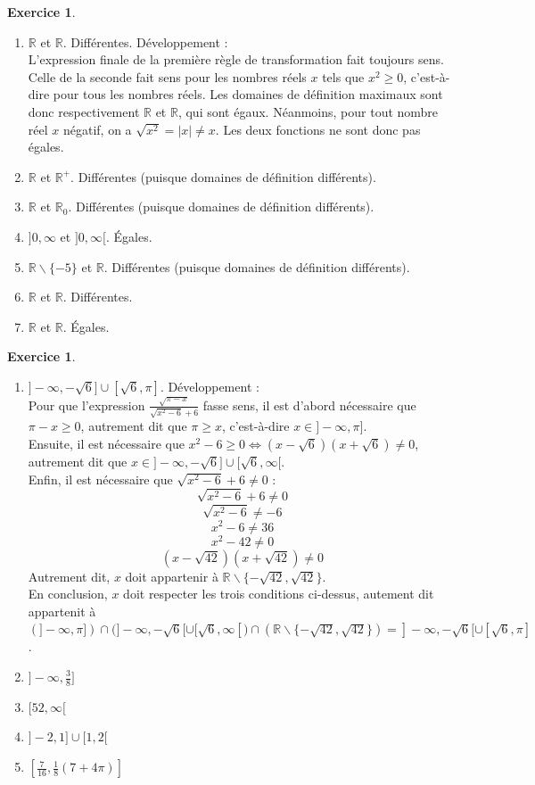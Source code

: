 \documentclass[a4paper,13pt]{scrreprt}
\theoremstyle{plain}
\theoremstyle{definition}
\newtheorem{exo}[subsection]{Exercice}
\newcommand{\rr}{\mathbb{R}}
\begin{document}
\begin{exo} ~~\\
	\begin{enumerate}
		\item $\rr$ et $\rr$. Différentes. Développement : \\
		L'expression finale de la première règle de transformation fait toujours sens. Celle de la seconde fait sens pour les nombres réels $x$ tels que $x^2 \ge 0$, c'est-à-dire pour tous les nombres réels. Les domaines de définition maximaux sont donc respectivement $\rr$ et $\rr$, qui sont égaux. Néanmoins, pour tout nombre réel $x$ négatif, on a $\sqrt{x^2}=|x| \neq x$. Les deux fonctions ne sont donc pas égales.
		\item $\rr$ et ${\rr}^{+}$. Différentes (puisque domaines de définition différents).
		\item $\rr$ et ${\rr}_{0}$. Différentes (puisque domaines de définition différents).
		\item $]0,\infty$ et $]0,\infty[$. \'Egales.
		\item ${\rr} \backslash \{-5\}$ et $\rr$. Différentes (puisque domaines de définition différents).
		\item $\rr$ et $\rr$. Différentes.
		\item $\rr$ et $\rr$. \'Egales.
	\end{enumerate}
\end{exo}

\begin{exo} ~~\\
	\begin{enumerate}
		\item $]-\infty,-\sqrt{6}] \cup [\sqrt{6},\pi]$. Développement : \\
		Pour que l'expression $\frac{\sqrt{\pi-x}}{\sqrt{x^2-6}+6}$ fasse sens, il est d'abord nécessaire que $\pi-x\ge 0$, autrement dit que $\pi\ge x$, c'est-à-dire $x \in ]-\infty,\pi]$. \\
		Ensuite, il est nécessaire que $x^2-6 \ge 0 \Leftrightarrow (x-\sqrt{6})(x+\sqrt{6}) \neq 0$, autrement dit que $x \in ]-\infty,-\sqrt{6}] \cup [\sqrt{6},\infty[$. \\
		Enfin, il est nécessaire que $\sqrt{x^2-6}+6 \neq 0$ : $$\sqrt{x^2-6}+6 \neq 0$$
		$$\sqrt{x^2-6} \neq -6$$
		$$x^2-6 \neq 36$$
		$$x^2-42 \neq 0$$
		$$(x-\sqrt{42})(x+\sqrt{42})\neq 0$$
		Autrement dit, $x$ doit appartenir à ${\rr} \backslash \{-\sqrt{42},\sqrt{42}\}$. \\
		En conclusion, $x$ doit respecter les trois conditions ci-dessus, autement dit appartenit à $(]-\infty,\pi]) \cap (]-\infty,-\sqrt{6}[ \cup [\sqrt{6},\infty[) \cap ({\rr} \backslash \{-\sqrt{42},\sqrt{42}\})= ]-\infty,-\sqrt{6}[ \cup [\sqrt{6},\pi]$.
		\item $]-\infty,\frac{3}{8}]$
		\item $[52,\infty[$
		\item $]-2,1] \cup [1,2[$
		\item $[\frac{7}{16},\frac{1}{8}(7+4 \pi)]$	
	\end{enumerate}
\end{exo}
\end{document}
